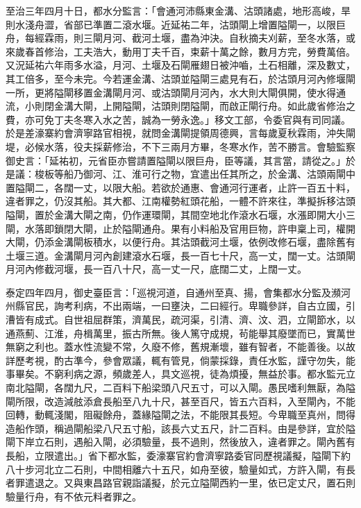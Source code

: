 \begin{pinyinscope}
 至治三年四月十日，都水分監言：「會通河沛縣東金溝、沽頭諸處，地形高峻，旱則水淺舟澀，省部已準置二滾水堰。近延祐二年，沽頭閘上增置隘閘一，以限巨舟，每經霖雨，則三閘月河、截河土堰，盡為沖決。自秋摘夫刈薪，至冬水落，或來歲春首修治，工夫浩大，動用丁夫千百，束薪十萬之餘，數月方完，勞費萬倍。又況延祐六年雨多水溢，月河、土堰及石閘雁翅日被沖嚙，土石相離，深及數丈，其工倍多，至今未完。今若運金溝、沽頭並隘閘三處見有石，於沽頭月河內修堰閘一所，更將隘閘移置金溝閘月河、或沽頭閘月河內，水大則大閘俱開，使水得通流，小則閉金溝大閘，上開隘閘，沽頭則閉隘閘，而啟正閘行舟。如此歲省修治之費，亦可免丁夫冬寒入水之苦，誠為一勞永逸。」移文工部，令委官與有司同議。於是差濠寨約會濟寧路官相視，就問金溝閘提領周德興，言每歲夏秋霖雨，沖失閘堤，必候水落，役夫採薪修治，不下三兩月方畢，冬寒水作，苦不勝言。會驗監察御史言：「延祐初，元省臣亦嘗請置隘閘以限巨舟，臣等議，其言當，請從之。」於是議：梭板等船乃御河、江、淮可行之物，宜遣出任其所之，於金溝、沽頭兩閘中置隘閘二，各闊一丈，以限大船。若欲於通惠、會通河行運者，止許一百五十料，違者罪之，仍沒其船。其大都、江南權勢紅頭花船，一體不許來往，準擬拆移沽頭隘閘，置於金溝大閘之南，仍作運環閘，其間空地北作滾水石堰，水漲即開大小三閘，水落即鎖閉大閘，止於隘閘通舟。果有小料船及官用巨物，許申稟上司，權開大閘，仍添金溝閘板積水，以便行舟。其沽頭截河土堰，依例改修石堰，盡除舊有土堰三道。金溝閘月河內創建滾水石堰，長一百七十尺，高一丈，闊一丈。沽頭閘月河內修截河堰，長一百八十尺，高一丈一尺，底闊二丈，上闊一丈。



 泰定四年四月，御史臺臣言：「巡視河道，自通州至真、揚，會集都水分監及瀕河州縣官民，詢考利病，不出兩端，一曰壅決，二曰經行。卑職參詳，自古立國，引漕皆有成式。自世祖屈群策，濟萬民，疏河渠，引清、濟、汶、泗，立閘節水，以通燕薊、江淮，舟楫萬里，振古所無。後人篤守成規，茍能舉其廢墜而已，實萬世無窮之利也。蓋水性流變不常，久廢不修，舊規漸壞，雖有智者，不能善後。以故詳歷考視，酌古準今，參會眾議，輒有管見，倘蒙採錄，責任水監，謹守勿失，能事畢矣。不窮利病之源，頻歲差人，具文巡視，徒為煩擾，無益於事。都水監元立南北隘閘，各闊九尺，二百料下船梁頭八尺五寸，可以入閘。愚民嗜利無厭，為隘閘所限，改造減舷添倉長船至八九十尺，甚至百尺，皆五六百料，入至閘內，不能回轉，動輒淺閣，阻礙餘舟，蓋緣隘閘之法，不能限其長短。今卑職至真州，問得造船作頭，稱過閘船梁八尺五寸船，該長六丈五尺，計二百料。由是參詳，宜於隘閘下岸立石則，遇船入閘，必須驗量，長不過則，然後放入，違者罪之。閘內舊有長船，立限遣出。」省下都水監，委濠寨官約會濟寧路委官同歷視議擬，隘閘下約八十步河北立二石則，中間相離六十五尺，如舟至彼，驗量如式，方許入閘，有長者罪遣退之。又與東昌路官親詣議擬，於元立隘閘西約一里，依已定丈尺，置石則驗量行舟，有不依元料者罪之。




\end{pinyinscope}
